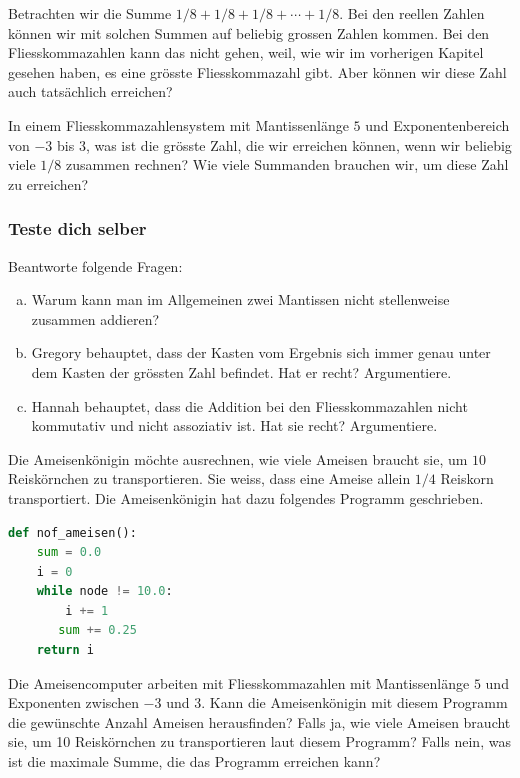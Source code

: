 \begin{aufgabe}\label{ein_achtel}
Betrachten wir die Summe \(1/8 + 1/8 + 1/8 + \dotsb + 1/8\).
Bei den reellen Zahlen können wir mit solchen Summen auf beliebig grossen Zahlen kommen. Bei den Fliesskommazahlen kann das nicht gehen, weil, wie wir im vorherigen Kapitel gesehen haben, es eine grösste Fliesskommazahl gibt. Aber können wir diese Zahl auch tatsächlich erreichen?

In einem Fliesskommazahlensystem mit Mantissenlänge \(5\) und Exponentenbereich von \(-3\) bis \(3\), was ist die grösste Zahl, die wir erreichen können, wenn wir beliebig viele \(1/8\) zusammen rechnen? Wie viele Summanden brauchen wir, um diese Zahl zu erreichen?
\end{aufgabe}


\subsubsection*{\textcolor{blue-violet}{Teste dich selber}}
\begin{aufgabe}\label{addition_kontrollfragen}
Beantworte folgende Fragen:
\begin{enumerate}[(a)]
\item Warum kann man im Allgemeinen zwei Mantissen nicht stellenweise zusammen addieren?
\item Gregory behauptet, dass der Kasten vom Ergebnis sich immer genau unter dem Kasten der grössten Zahl befindet. Hat er recht? Argumentiere.
\item Hannah behauptet, dass die Addition bei den Fliesskommazahlen nicht kommutativ und nicht assoziativ ist. Hat sie recht? Argumentiere.
\end{enumerate}
\end{aufgabe}

\begin{aufgabe}\label{ameisenkönigin}
Die Ameisenkönigin möchte ausrechnen, wie viele Ameisen braucht sie, um \(10\) Reiskörnchen zu transportieren. Sie weiss, dass eine Ameise allein \(1/4\) Reiskorn transportiert. Die Ameisenkönigin hat dazu folgendes Programm geschrieben.
\begin{lstlisting}[language=Python, caption={Programm von der Ameisenkönigin}]
def nof_ameisen():
    sum = 0.0
    i = 0
    while node != 10.0:
    	i += 1
       sum += 0.25
    return i
\end{lstlisting}
Die Ameisencomputer arbeiten mit Fliesskommazahlen mit Mantissenlänge \(5\) und Exponenten zwischen \(-3\) und \(3\).
Kann die Ameisenkönigin mit diesem Programm die gewünschte Anzahl Ameisen herausfinden? Falls ja, wie viele Ameisen braucht sie, um 10 Reiskörnchen zu transportieren laut diesem Programm? Falls nein, was ist die maximale Summe, die das Programm erreichen kann?
\end{aufgabe}